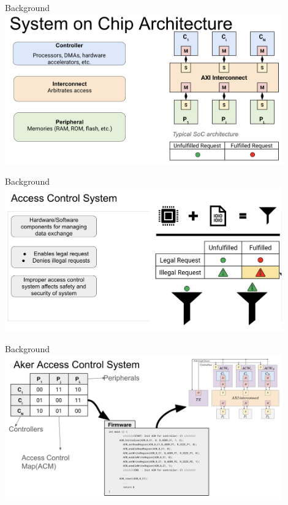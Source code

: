 \begin{frame}{Background}
    \centering
    \includegraphics[height=0.9\textheight,width=0.9\textwidth,keepaspectratio]{soc.png}
\end{frame}

\begin{frame}{Background}
    \centering
    \includegraphics[height=0.9\textheight,width=0.9\textwidth,keepaspectratio]{acs.png}
\end{frame}

\begin{frame}{Background}
    \centering
    \includegraphics[height=0.9\textheight,width=0.9\textwidth,keepaspectratio]{aker.png}
\end{frame}

